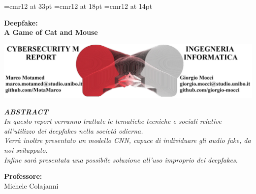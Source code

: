 \begin{titlepage}

\begin{center}
\font\myfont=cmr12 at 33pt
\font\abstractfont=cmr12 at 18pt
\font\customfont=cmr12 at 14pt

\Large \textbf{{\myfont Deepfake:\\ A Game of Cat and Mouse\textbf{}}}

\vspace{2em}%
\includegraphics[width=1\textwidth]{img/logo.jpg}\\%


 \vspace{3em}%


\emph{\customfont \textbf{{\abstractfont} ABSTRACT\textbf{}} \\  In questo report verranno trattate le tematiche tecniche e sociali relative all'utilizzo dei deepfakes nella società odierna.\\ Verrà inoltre presentato un modello CNN, capace di individuare gli audio fake, da noi sviluppato. \\ Infine sarà presentata una possibile soluzione all'uso improprio dei deepfakes.  }

        \vspace{1in}

       

\normalsize {\customfont \textbf{Professore: }\\

Michele Colajanni}\\
\vspace{1em}



\end{center}
\end{titlepage}

